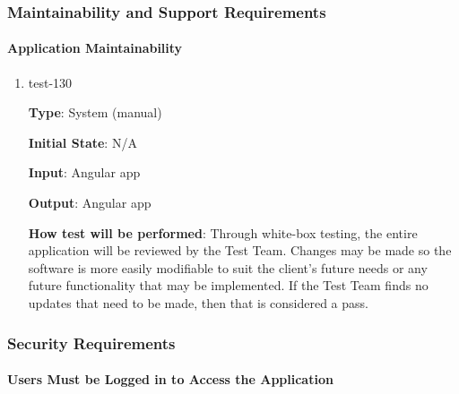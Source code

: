 \documentclass[12pt, titlepage]{article}
\begin{document}
\subsubsection{Maintainability and Support Requirements}
		
\paragraph{Application Maintainability}

\begin{enumerate}

\item{test-130\\}

\textbf{Type}: System (manual)
					
\textbf{Initial State}: N/A
					
\textbf{Input}: Angular app
					
\textbf{Output}: Angular app
					
\textbf{How test will be performed}: Through white-box testing, the entire application will be reviewed by the Test Team. Changes may be made so the software is more easily modifiable to suit the client's future needs or any future functionality that may be implemented. If the Test Team finds no updates that need to be made, then that is considered a pass.
\end{enumerate}


\subsubsection{Security Requirements}
		
\paragraph{Users Must be Logged in to Access the Application}
\end{document}
